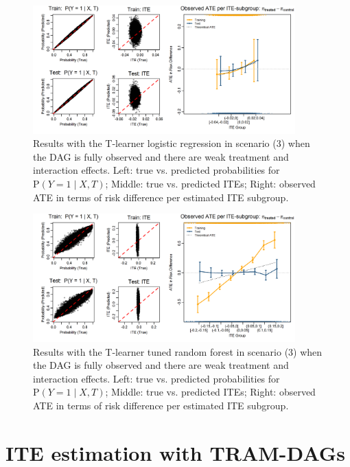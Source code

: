 \begin{figure}[htbp]
\centering
\includegraphics[width=0.9\textwidth]{img/results_ITE_simulation/small_interaction_glm_tlearner.png}
\caption{Results with the T-learner logistic regression in scenario (3) when the DAG is fully observed and there are weak treatment and interaction effects. Left: true vs. predicted probabilities for $\text{P}(Y=1 \mid X, T)$; Middle: true vs. predicted ITEs; Right: observed ATE in terms of risk difference per estimated ITE subgroup.}
\label{fig:small_interaction_glm_tlearner}
\end{figure}




\begin{figure}[htbp]
\centering
\includegraphics[width=0.9\textwidth]{img/results_ITE_simulation/small_interaction_tuned_rf_tlearner.png}
\caption{Results with the T-learner tuned random forest in scenario (3) when the DAG is fully observed and there are weak treatment and interaction effects. Left: true vs. predicted probabilities for $\text{P}(Y=1 \mid X, T)$; Middle: true vs. predicted ITEs; Right: observed ATE in terms of risk difference per estimated ITE subgroup.}
\label{fig:small_interaction_tuned_rf_tlearner}
\end{figure}


\clearpage


\section{ITE estimation with TRAM-DAGs}

